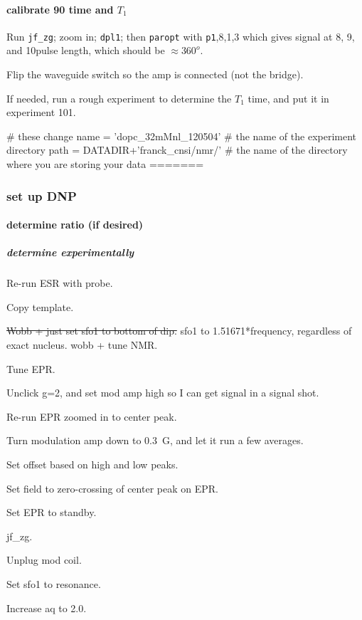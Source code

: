 \paragraph{calibrate 90 time and $T_1$}

Run \texttt{jf_zg}; zoom in; \texttt{dpl1}; then \texttt{paropt} with \texttt{p1},8,1,3 which gives signal at 8\us, 9\us, and 10\us pulse length, which should be $\approx 360^o$.

Flip the waveguide switch so the amp is connected (not the bridge).

If needed, run a rough experiment to determine the $T_1$ time, and put it in experiment 101.

\begin{scriptsize}
\begin{python}[off]
# these change
name = 'dopc_32mMnl_120504' # the name of the experiment directory
path = DATADIR+'franck_cnsi/nmr/' # the name of the directory where you are storing your data
=======
\subsubsection{set up DNP}
\paragraph{determine ratio (if desired)}

\subparagraph{determine experimentally}
Re-run ESR with probe.

Copy template.

\sout{ Wobb + just set sfo1 to bottom of dip. }
sfo1 to 1.51671*frequency, regardless of exact nucleus.
wobb + tune NMR.

Tune EPR.

Unclick g=2, and set mod amp high so I can get signal in a signal shot.

Re-run EPR zoomed in to center peak.

Turn modulation amp down to 0.3~G, and let it run a few averages.

Set offset based on high and low peaks.

Set field to zero-crossing of center peak on EPR.

Set EPR to standby.

jf\_zg.

Unplug mod coil.

Set sfo1 to resonance.

Increase aq to 2.0.  


\end{python}
\end{scriptsize}
